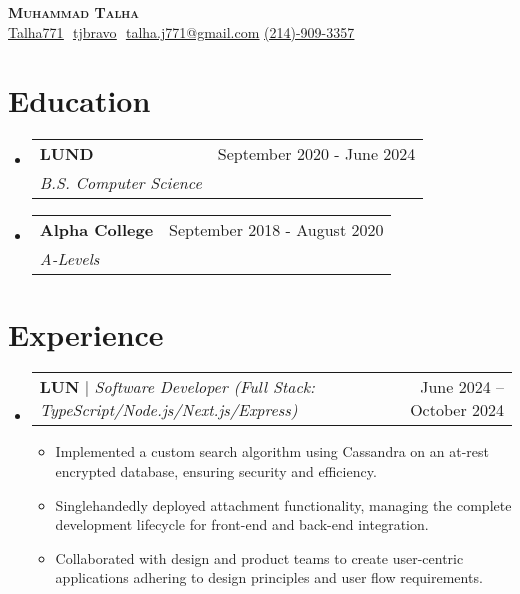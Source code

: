 \documentclass{article}
\makeatletter
\newcommand{\resumeSubheading}[4]{
  \vspace{-2pt}\item
    \begin{tabular*}{0.97\textwidth}[t]{l@{\extracolsep{\fill}}r}
      \textbf{#1} & #2 \\
      \textit{\small#3} & \textit{\small #4} \\
    \end{tabular*}\vspace{-7pt}
}
\newcommand{\resumeProjectHeading}[2]{
    \item
    \begin{tabular*}{0.97\textwidth}{l@{\extracolsep{\fill}}r}
      \small#1 & #2 \\
    \end{tabular*}\vspace{-7pt}
}
\newcommand{\resumeSubHeadingListStart}{\begin{itemize}[leftmargin=0.15in, label={}]}
\newcommand{\resumeSubHeadingListEnd}{\end{itemize}}
\makeatother
\begin{document}
\begin{description}
    \item 
        \begin{center}
            \textbf{\Huge \scshape Muhammad Talha} \\ \vspace{8pt}
            \small 
            \href{https://github.com/Talha771}
            {\underline{Talha771}} $  $
            \href{https://linkedin.com/in/tjbravo}{\underline{tjbravo}} $  $
            \href{mailto:talha.j771@gmail.com}
            {\underline{talha.j771@gmail.com}}
            \href{tel:(214)9093357}{\underline{(214)-909-3357}}
        \end{center}
\end{description}


\section{Education}
\resumeSubHeadingListStart

    \resumeSubheading
      {LUND}{September 2020 - June 2024}
      {B.S. Computer Science}{}
    \resumeSubheading
      {Alpha College}{September 2018 - August 2020}
      {A-Levels}{}
\resumeSubHeadingListEnd


\section{Experience}
\resumeSubHeadingListStart

    \resumeProjectHeading
    {\textbf{LUN}\vspace{8pt} $|$ \footnotesize\emph{Software Developer (Full Stack: TypeScript/Node.js/Next.js/Express)}}{June 2024 -- October 2024}
    \begin{itemize}
        \item Implemented a custom search algorithm using Cassandra on an at-rest encrypted database, ensuring security and efficiency.
        \item Singlehandedly deployed attachment functionality, managing the complete development lifecycle for front-end and back-end integration.
        \item Collaborated with design and product teams to create user-centric applications adhering to design principles and user flow requirements.
    \end{itemize}
\resumeSubHeadingListEnd
\end{document}
